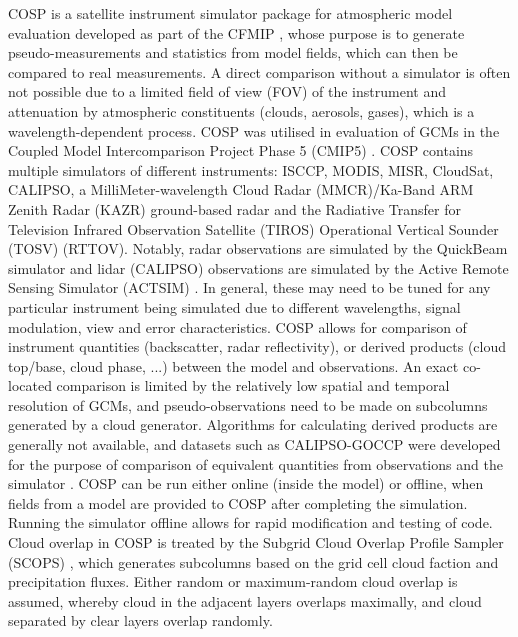 COSP \citep{bodas-salcedo2011} is a satellite instrument simulator package
for atmospheric model evaluation developed as part of
the CFMIP \citep{bony2011},
whose purpose is to generate pseudo-measurements and statistics from model fields, which can
then be compared to real
measurements. A direct comparison without a simulator is often not possible
due to a limited field of view (FOV) of the instrument and attenuation by atmospheric
constituents (clouds, aerosols, gases), which is a wavelength-dependent process.
COSP was utilised in evaluation of GCMs in the
Coupled Model Intercomparison Project Phase 5 (CMIP5) \citep{taylor2011}.
COSP contains multiple simulators of different instruments:
ISCCP, MODIS, MISR, CloudSat, CALIPSO, a MilliMeter-wavelength Cloud Radar
(MMCR)/Ka-Band ARM Zenith Radar (KAZR) ground-based radar
and the Radiative Transfer for Television Infrared Observation Satellite (TIROS)
Operational Vertical Sounder (TOSV) (RTTOV).
Notably, radar observations are simulated by the QuickBeam simulator
\citep{haynes2007} and lidar (CALIPSO) observations are simulated
by the Active Remote Sensing Simulator (ACTSIM) \citep{chepfer2008}. In general, these may need
to be tuned for any particular instrument being simulated due to different
wavelengths, signal modulation, view and error characteristics.
COSP allows for comparison of instrument quantities
(backscatter, radar reflectivity), or derived products
(cloud top/base, cloud phase, ...) between the model and observations.
An exact co-located comparison is limited by the relatively low spatial and
temporal resolution
of GCMs, and pseudo-observations need to be made on subcolumns generated by
a cloud generator. Algorithms for calculating derived products are generally not
available, and datasets such as CALIPSO-GOCCP were developed for the purpose
of comparison of equivalent quantities from observations and the simulator
\citep{chepfer2010}.
COSP can be run either online (inside the model) or offline,
when fields from a model are provided to COSP after completing the simulation.
Running the simulator offline allows for rapid modification
and testing of code. Cloud overlap in COSP is treated by the Subgrid Cloud Overlap Profile Sampler
(SCOPS) \citep{webb2001}, which generates subcolumns based on the grid cell
cloud faction and precipitation fluxes. Either random or maximum-random cloud overlap
\citep{geleyn1979,ritter1992} is assumed,
whereby cloud in the adjacent layers overlaps maximally, and cloud separated
by clear layers overlap randomly.

